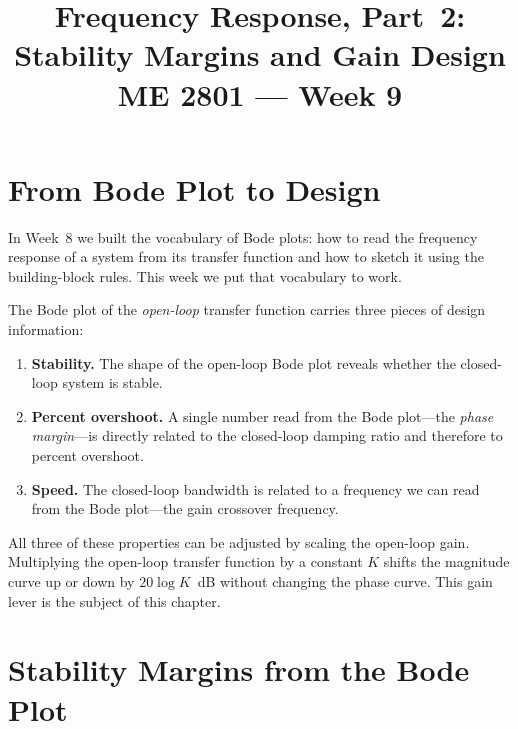 \documentclass[12pt]{article}
\title{Frequency Response, Part~2: Stability Margins and Gain Design\\[0.5em]
\large ME 2801 --- Week 9}
\author{}
\date{}
\begin{document}
\maketitle
\tableofcontents
\newpage

\section{From Bode Plot to Design}
\label{sec:intro}

In Week~8 we built the vocabulary of Bode plots: how to read the frequency
response of a system from its transfer function and how to sketch it using the
building-block rules.  This week we put that vocabulary to work.

The Bode plot of the \emph{open-loop} transfer function carries three pieces of
design information:

\begin{enumerate}
  \item \textbf{Stability.}  The shape of the open-loop Bode plot reveals
    whether the closed-loop system is stable.
  \item \textbf{Percent overshoot.}  A single number read from the Bode
    plot---the \emph{phase margin}---is directly related to the closed-loop
    damping ratio and therefore to percent overshoot.
  \item \textbf{Speed.}  The closed-loop bandwidth is related to a frequency
    we can read from the Bode plot---the gain crossover frequency.
\end{enumerate}

All three of these properties can be adjusted by scaling the open-loop gain.
Multiplying the open-loop transfer function by a constant $K$ shifts the
magnitude curve up or down by $20\log K$~dB without changing the phase curve.
This gain lever is the subject of this chapter.

\section{Stability Margins from the Bode Plot}
\label{sec:margins}

\end{document}
